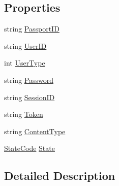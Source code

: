 \subsection*{Properties}
\begin{DoxyCompactItemize}
\item 
string \mbox{\hyperlink{class_t_net_1_1_sns_1_1_account_server_login_a03d237626e1941a360c8a9d81f13cfa2}{Passport\+ID}}
\item 
string \mbox{\hyperlink{class_t_net_1_1_sns_1_1_account_server_login_a8d949e3cc37a050e954d52be37a27a5e}{User\+ID}}
\item 
int \mbox{\hyperlink{class_t_net_1_1_sns_1_1_account_server_login_a46b7322ea72c8513976ca509c1411541}{User\+Type}}
\item 
string \mbox{\hyperlink{class_t_net_1_1_sns_1_1_account_server_login_a3b1b91eaef3807f71fe58004e8220f3c}{Password}}
\item 
string \mbox{\hyperlink{class_t_net_1_1_sns_1_1_account_server_login_a922027c89f0b0e153b2d8151f505f72e}{Session\+ID}}
\item 
string \mbox{\hyperlink{class_t_net_1_1_sns_1_1_account_server_login_adac06ef000b3ff76c768a834c521e404}{Token}}
\item 
string \mbox{\hyperlink{class_t_net_1_1_sns_1_1_account_server_login_acbd692b1d2d19b9e19eef0a565fc5b5b}{Content\+Type}}
\item 
\mbox{\hyperlink{namespace_t_net_1_1_sns_1_1_service_ab93c34900ebc0ee83129c9ccab1e4bd8}{State\+Code}} \mbox{\hyperlink{class_t_net_1_1_sns_1_1_account_server_login_adf88e17851d9af17bce056f242f10f9d}{State}}
\end{DoxyCompactItemize}


\subsection{Detailed Description}





